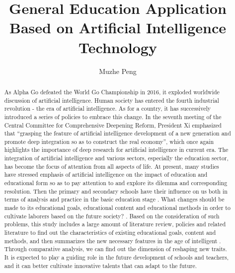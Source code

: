 \documentclass[11pt,en,authoryear]{elegantpaper}
\title{General Education Application Based on Artificial Intelligence Technology}
\author{Muzhe Peng}
\institute{Central China Normal University Wollongkong Joint Institute}
\date{}
\begin{document}
\maketitle


\begin{abstract}
	As Alpha Go defeated the World Go Championship in 2016, it exploded worldwide discussion of artificial intelligence. Human society has entered the fourth industrial revolution - the era of artificial intelligence. As for a country, it has successively introduced a series of policies to embrace this change. In the seventh meeting of the Central Committee for Comprehensive Deepening Reform, President Xi emphasized that “grasping the feature of artificial intelligence development of a new generation and promote deep integration so as to construct the real economy”, which once again highlights the importance of deep research for artificial intelligence in current era. The integration of artificial intelligence and various sectors, especially the education sector, has become the focus of attention from all aspects of life. At present, many studies have stressed emphasis of artificial intelligence on the impact of education and educational form so as to pay attention to and explore its dilemma and corresponding resolution. Then the primary and secondary schools have their influence on us both in terms of analysis and practice in the basic education stage . What changes should be made to its educational goals, educational content and educational methods in order to cultivate laborers based on the future society? . Based on the consideration of such problems, this study includes a large amount of literature review, policies and related literature to find out the characteristics of existing educational goals, content and methods, and then summarizes the new necessary features in the age of intelligent . Through comparative analysis, we can find out the dimension of reshaping new traits. It is expected to play a guiding role in the future development of schools and teachers, and it can better cultivate innovative talents that can adapt to the future.
  \end{abstract}
\end{document}
